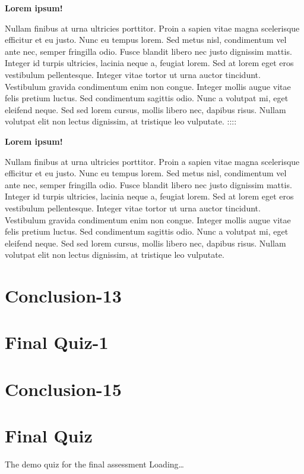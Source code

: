 \documentclass[
]{book}
\begin{document}
\textbf{Lorem ipsum!}

Nullam finibus at urna ultricies porttitor. Proin a sapien vitae magna scelerisque efficitur et eu justo. Nunc eu tempus lorem. Sed metus nisl, condimentum vel ante nec, semper fringilla odio. Fusce blandit libero nec justo dignissim mattis. Integer id turpis ultricies, lacinia neque a, feugiat lorem. Sed at lorem eget eros vestibulum pellentesque. Integer vitae tortor ut urna auctor tincidunt. Vestibulum gravida condimentum enim non congue. Integer mollis augue vitae felis pretium luctus. Sed condimentum sagittis odio. Nunc a volutpat mi, eget eleifend neque. Sed sed lorem cursus, mollis libero nec, dapibus risus. Nullam volutpat elit non lectus dignissim, at tristique leo vulputate.
::::

\textbf{Lorem ipsum!}

Nullam finibus at urna ultricies porttitor. Proin a sapien vitae magna scelerisque efficitur et eu justo. Nunc eu tempus lorem. Sed metus nisl, condimentum vel ante nec, semper fringilla odio. Fusce blandit libero nec justo dignissim mattis. Integer id turpis ultricies, lacinia neque a, feugiat lorem. Sed at lorem eget eros vestibulum pellentesque. Integer vitae tortor ut urna auctor tincidunt. Vestibulum gravida condimentum enim non congue. Integer mollis augue vitae felis pretium luctus. Sed condimentum sagittis odio. Nunc a volutpat mi, eget eleifend neque. Sed sed lorem cursus, mollis libero nec, dapibus risus. Nullam volutpat elit non lectus dignissim, at tristique leo vulputate.

\hypertarget{conclusion-13}{%
\chapter{Conclusion-13}\label{conclusion-13}}

\hypertarget{final-quiz-1}{%
\chapter{Final Quiz-1}\label{final-quiz-1}}

\hypertarget{conclusion-15}{%
\chapter{Conclusion-15}\label{conclusion-15}}

\hypertarget{final-quiz}{%
\chapter{Final Quiz}\label{final-quiz}}

The demo quiz for the final assessment
Loading\ldots{}

  
\end{document}
